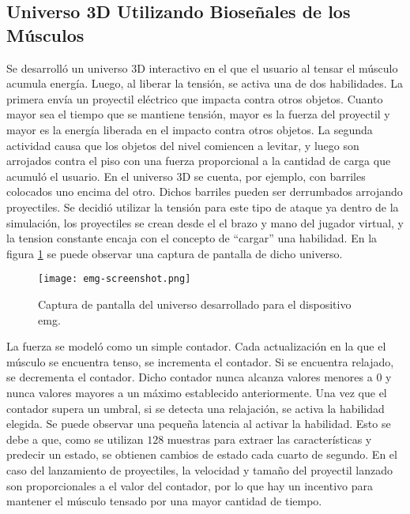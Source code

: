 \subsection{Universo 3D Utilizando Bioseñales de los Músculos}

Se desarrolló un universo 3D interactivo en el que el usuario al tensar el músculo acumula energía. Luego, al liberar la tensión, se activa una de dos habilidades. La primera envía un proyectil eléctrico que impacta contra otros objetos. Cuanto mayor sea el tiempo que se mantiene tensión, mayor es la fuerza del proyectil y mayor es la energía liberada en el impacto contra otros objetos. La segunda actividad causa que los objetos del nivel comiencen a levitar, y luego son arrojados contra el piso con una fuerza proporcional a la cantidad de carga que acumuló el usuario. En el universo 3D se cuenta, por ejemplo, con barriles colocados uno encima del otro. Dichos barriles pueden ser derrumbados arrojando proyectiles. Se decidió utilizar la tensión para este tipo de ataque ya dentro de la simulación, los proyectiles se crean desde el el brazo y mano del jugador virtual, y la tension constante encaja con el concepto de ``cargar'' una habilidad. En la figura \ref{fig:emg-screenshot} se puede observar una captura de pantalla de dicho universo.

\begin{figure}[H]
	\centering
    \texttt{[image: emg-screenshot.png]}
    \caption{Captura de pantalla del universo desarrollado para el dispositivo \acrshort{emg}.}
	\label{fig:emg-screenshot}
\end{figure}


La fuerza se modeló como un simple contador. Cada actualización en la que el músculo se encuentra tenso, se incrementa el contador. Si se encuentra relajado, se decrementa el contador. Dicho contador nunca alcanza valores menores a $0$ y nunca valores mayores a un máximo establecido anteriormente. Una vez que el contador supera un umbral, si se detecta una relajación, se activa la habilidad elegida. Se puede observar una pequeña latencia al activar la habilidad. Esto se debe a que, como se utilizan $128$ muestras para extraer las características y predecir un estado, se obtienen cambios de estado cada cuarto de segundo. En el caso del lanzamiento de proyectiles, la velocidad y tamaño del proyectil lanzado son proporcionales a el valor del contador, por lo que hay un incentivo para mantener el músculo tensado por una mayor cantidad de tiempo.

